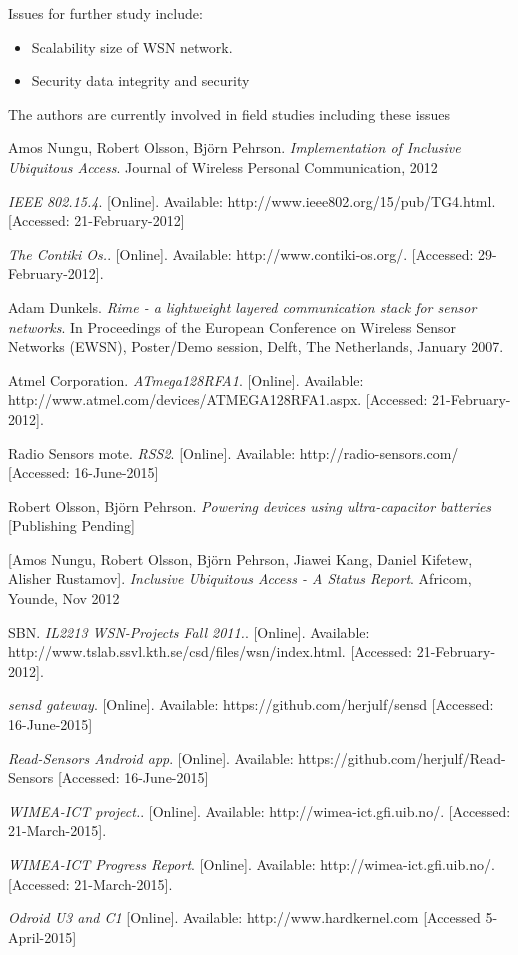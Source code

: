 \documentclass[conference, a4paper,10pt,twocolumn]{IEEEtran}
\begin{document}
Issues for further study include: 

\begin{itemize}
\item Scalability 
\itemHow size of WSN network.

\item Security
\itemHow data integrity and security

\end{itemize} 

The authors are currently involved in field studies including these issues

\begin{thebibliography}{1}

 Amos Nungu, Robert Olsson, Bj\"{o}rn Pehrson. \emph{Implementation of Inclusive Ubiquitous Access}. 
Journal of Wireless Personal Communication, 2012

  \emph{IEEE 802.15.4}. 
[Online]. Available: http://www.ieee802.org/15/pub/TG4.html. [Accessed: 21-February-2012]

  \emph{The Contiki Os.}. 
[Online]. Available: http://www.contiki-os.org/. [Accessed: 29-February-2012].

 Adam Dunkels. \emph{Rime - a lightweight layered communication stack for sensor networks}.   In Proceedings of the European Conference on Wireless Sensor Networks (EWSN), Poster/Demo session, Delft, The Netherlands, January 2007.

 Atmel Corporation. \emph{ATmega128RFA1}. 
[Online]. Available: http://www.atmel.com/devices/ATMEGA128RFA1.aspx. [Accessed: 21-February-2012].

 Radio Sensors mote. \emph{RSS2}. 
[Online]. Available: http://radio-sensors.com/ [Accessed: 16-June-2015]

 Robert Olsson, Bj\"{o}rn Pehrson. \emph{Powering devices using ultra-capacitor batteries}
[Publishing Pending]

 [Amos Nungu, Robert Olsson, Bj\"{o}rn Pehrson, Jiawei Kang, Daniel Kifetew, Alisher Rustamov]. \emph{Inclusive Ubiquitous Access - A Status Report}. 
Africom, Younde, Nov 2012

 SBN. \emph{IL2213 WSN-Projects Fall 2011.}. 
[Online]. Available: http://www.tslab.ssvl.kth.se/csd/files/wsn/index.html. [Accessed: 21-February-2012].

  \emph{sensd gateway}. 
[Online]. Available: https://github.com/herjulf/sensd [Accessed: 16-June-2015]

  \emph{Read-Sensors Android app}. 
[Online]. Available: https://github.com/herjulf/Read-Sensors [Accessed: 16-June-2015]

  \emph{WIMEA-ICT project.}. 
[Online]. Available: http://wimea-ict.gfi.uib.no/. [Accessed: 21-March-2015].

  \emph{WIMEA-ICT Progress Report}. 
[Online]. Available: http://wimea-ict.gfi.uib.no/. [Accessed: 21-March-2015].

 \emph{Odroid U3 and C1}
[Online]. Available: http://www.hardkernel.com [Accessed 5-April-2015]
\end{thebibliography}
\end{document}
